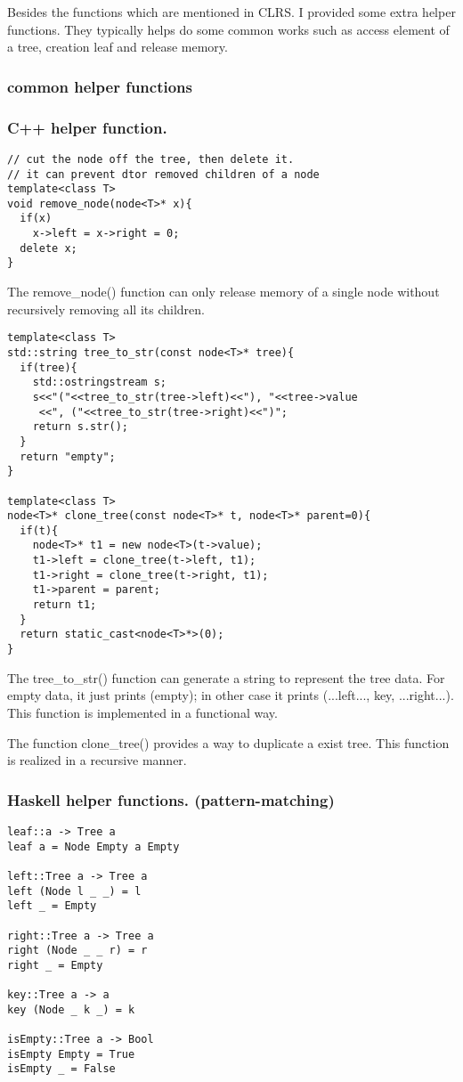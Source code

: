 \documentclass{article}
\begin{document}
Besides the functions which are mentioned in CLRS\cite{CLRS}. I provided some
extra helper functions. They typically helps do some common works such as 
access element of a tree, creation leaf and release memory.

\subsubsection{common helper functions}

\subsubsection*{C++ helper function.}
\lstset{language=C++}
\begin{lstlisting}
// cut the node off the tree, then delete it.
// it can prevent dtor removed children of a node
template<class T>
void remove_node(node<T>* x){
  if(x)
    x->left = x->right = 0;
  delete x;
}
\end{lstlisting}

The remove\_node() function can only release memory of a single node without recursively
removing all its children. 

\begin{lstlisting}
template<class T>
std::string tree_to_str(const node<T>* tree){
  if(tree){
    std::ostringstream s;
    s<<"("<<tree_to_str(tree->left)<<"), "<<tree->value
     <<", ("<<tree_to_str(tree->right)<<")";
    return s.str();
  }
  return "empty";
}

template<class T>
node<T>* clone_tree(const node<T>* t, node<T>* parent=0){
  if(t){
    node<T>* t1 = new node<T>(t->value);
    t1->left = clone_tree(t->left, t1);
    t1->right = clone_tree(t->right, t1);
    t1->parent = parent;
    return t1;
  }
  return static_cast<node<T>*>(0);
}
\end{lstlisting}

The tree\_to\_str() function can generate a string
to represent the tree data. For empty data, it just prints (empty); in other case
it prints (...left..., key, ...right...). This function is implemented in a
functional way.

The function clone\_tree() provides a way to duplicate a exist tree. This
function is realized in a recursive manner.

\subsubsection*{Haskell helper functions. (pattern-matching)}
\lstset{language=Haskell}
\begin{lstlisting}
leaf::a -> Tree a
leaf a = Node Empty a Empty

left::Tree a -> Tree a
left (Node l _ _) = l
left _ = Empty

right::Tree a -> Tree a
right (Node _ _ r) = r
right _ = Empty

key::Tree a -> a
key (Node _ k _) = k

isEmpty::Tree a -> Bool
isEmpty Empty = True
isEmpty _ = False
\end{lstlisting}
\end{document}
